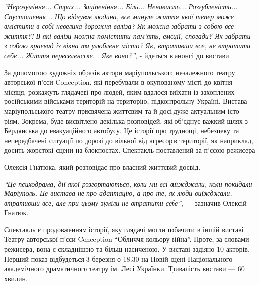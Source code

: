 
\begin{leftbar}
\emph{\enquote{Нерозуміння... Страх... Заціпеніння... Біль... Ненависть... Розгубленість...
Спустошення... Що відчуває людина, все минуле життя якої тепер може
вмістити в собі невелика дорожня валіза? Як можна забрати з собою все
життя?! В які валізи можна помістити пам'ять, емоції, спогади? Як
забрати з собою краєвид із вікна та улюблене місто? Як, втративши все,
не втратити себе... Життя переселенське... Яке воно?}}, - йдеться в анонсі
до вистави. 
\end{leftbar}

За допомогою художніх образів актори маріупольського незалежного театру
авторської п'єси Conception, які перебували в окупованому місті до квітня
місяця, розкажуть глядачеві про людей, яким вдалося виїхати із захоплених
російськими військами територій на територію, підконтрольну Україні. Вистава
маріупольського театру присвячена життєвим та й досі дуже актуальним істо\hyp{}ріям.
Зокрема, буде висвітлено декілька розповідей, які об'єднує важкий шлях з
Бердянська до евакуаційного автобусу. Це історії про труднощі, небезпеку та
непередбачені ситуації по дорозі до вільної від агресорів території, як
наприклад, досить жорстокі сцени на блокпостах. Спектакль поставлений за п'єсою
режисера\par\noindent Олексія Гнатюка, який розповідає про власний життєвий досвід.



\begin{leftbar}
\emph{\enquote{Це психодрама, дії якої розгортаються, коли ми всі виїжджали, коли
покидали Маріуполь. Це вистава не про адаптацію, а про те, як люди
виїжджали, втративши все, але при цьому зуміли не втратити себе}}, —
зазначив Олексій Гнатюк. 
\end{leftbar}

Спектакль є продовженням історії, яку глядачі могли побачити в іншій виставі
Театру авторської п'єси Conception \enquote{Обличчя кольору війна}. Проте, за словами
режисера, вона є складнішою та більш насиченою. У виставі задіяно 10 акторів.
Перший показ відбудеться 3 березня о 18.30 на Новій сцені Національного
академічного драматичного театру ім. Лесі Українки. Тривалість вистави — 60
хвилин.

